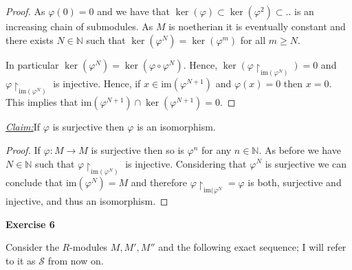 \documentclass{article}
\newcommand{\N}{\mathbb{N}}
\newcommand{\im}{\mathrm{im}}
\newcommand{\claim}
{\underline{\textit{Claim:}}\hspace{0,2cm}}
\newcommand{\aufgabe}[1]{
{
	\vspace*{0.5cm}
	\noindent\textsf{\textbf{Exercise #1}}
	\vspace*{0.2cm}

}
}
\theoremstyle{definition}
\theoremstyle{plain}
\theoremstyle{remark}
\begin{document}
\begin{proof}
	As $\varphi(0)=0$ and we have that $\ker(\varphi) \subset \ker(\varphi^2)\subset ..$ is an increasing chain of submodules. As $M$ is noetherian it is eventually constant and there exists $N\in \N$ such that $\ker(\varphi^N)=\ker(\varphi^m)$ for all $m\geq N$.

	In particular $\ker(\varphi^N)=\ker(\varphi\circ\varphi^N)$. 
	Hence, $\ker(\varphi\restriction_{\im(\varphi^N)})=0$ and $\varphi\restriction_{\im(\varphi^N)}$ is injective. Hence, if $x\in\im(\varphi^{N+1})$ and $\varphi(x)= 0$ then $x = 0$. This implies that $\im(\varphi^{N+1})\cap \ker(\varphi^{N+1})=0$.
\end{proof}
\claim If $\varphi$ is surjective then $\varphi$ is an isomorphism.
\begin{proof}
	If $\varphi: M\rightarrow M$ is surjective then so is $\varphi^n$ for any $n\in\N$. As before we have $N\in\N$ such that $\varphi\restriction_{\im(\varphi^N)}$ is injective. Considering that $\varphi^N$ is surjective we can conclude that $\im(\varphi^N) = M$ and therefore $\varphi\restriction_{\im(\varphi^N}=\varphi$ is both, surjective and injective, and thus an isomorphism.
\end{proof}
\aufgabe6
Consider the $R$-modules $M,M',M''$ and the following exact sequence; I will refer to it as $\mathcal{S}$ from now on.
\begin{figure}[h]
\centering
{}
\end{figure}
\end{document}
